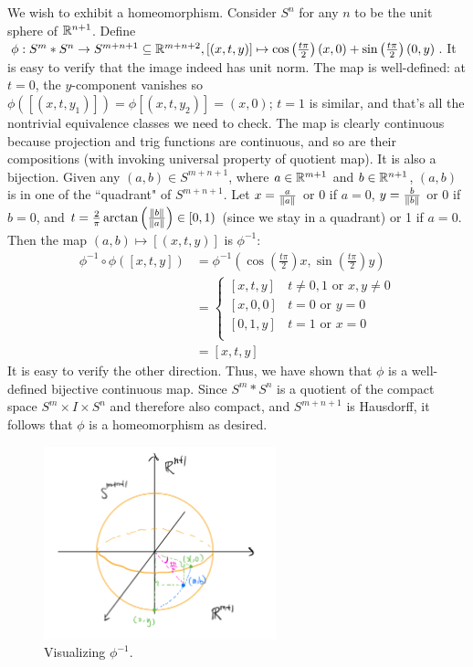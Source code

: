 \documentclass[12pt]{article}
\begin{document}
\begin{problem}[4]
	We wish to exhibit a homeomorphism. Consider $ S^{n}$ for any $ n$ to be the unit sphere of $ \mathbb{R}^{n+1}$. Define $ \phi: S^{m} * S^{n} \to S^{m+n+1} \subseteq \mathbb{R}^{m+n+2}, [(x,t,y)] \mapsto \cos \left( \frac{t \pi}{2} \right) (x,0) + \sin \left( \frac{t \pi}{ 2} \right) (0,y)$. It is easy to verify that the image indeed has unit norm. The map is well-defined: at $ t=0$, the  $ y$-component vanishes so  $ \phi([(x,t,y_1)]) = \phi[(x,t,y_2)] = (x,0)$; $ t=1$ is similar, and that's all the nontrivial equivalence classes we need to check. The map is clearly continuous because projection and trig functions are continuous, and so are their compositions (with invoking universal property of quotient map). It is also a bijection. Given any  $ (a,b) \in S^{m+n+1}$, where $ a \in \mathbb{R}^{m+1}$ and $ b \in \mathbb{R}^{n+1}$, $ (a,b)$ is in one of the ``quadrant" of $ S^{m+n+1}$. Let $ x = \frac{a}{ {\left\lVert{ a}\right\rVert} }$ or 0 if $ a=0$, $y = \frac{b}{ {\left\lVert{ b}\right\rVert} }$ or 0 if $ b=0$, and $ t =\frac{2}{ \pi} \arctan \left( \frac{{\left\lVert{ b}\right\rVert} }{{\left\lVert{ a}\right\rVert} } \right) \in [0,1)$ (since we stay in a quadrant) or 1 if $ a=0$. Then the map $ (a,b) \mapsto [(x,t,y)]$ is $ \phi^{-1}$:
\begin{align*}
	\phi ^{-1} \circ \phi([x,t,y]) &= \phi ^{-1} \left( \cos \left( \frac{t \pi}{ 2} \right)x, \sin \left( \frac{t \pi}{ 2} \right) y \right)  \\
				       &=\begin{cases}
					       [x,t,y] & t \neq 0,1 \text{ or } x,y \neq 0 \\
					       [x,0,0] & t = 0 \text{ or }y=0 \\
					       [0,1,y] & t = 1 \text{ or } x=0 \\
				       \end{cases}\\
				       &= [x,t,y] 
\end{align*}
It is easy to verify the other direction. Thus, we have shown that $ \phi$ is a well-defined bijective continuous map. Since $ S^{m} * S^{n}$ is a quotient of the compact space $ S^{m} \times I \times S^{n}$ and therefore also compact, and $ S^{m+n+1}$ is Hausdorff, it follows that $ \phi$ is a homeomorphism as desired.
~\begin{figure}[H]
	\centering
	\includegraphics[width=0.6\textwidth]{./figures/join.png}
	\caption{Visualizing $ \phi ^{-1}$.}
\end{figure}
\end{problem}
\end{document}
